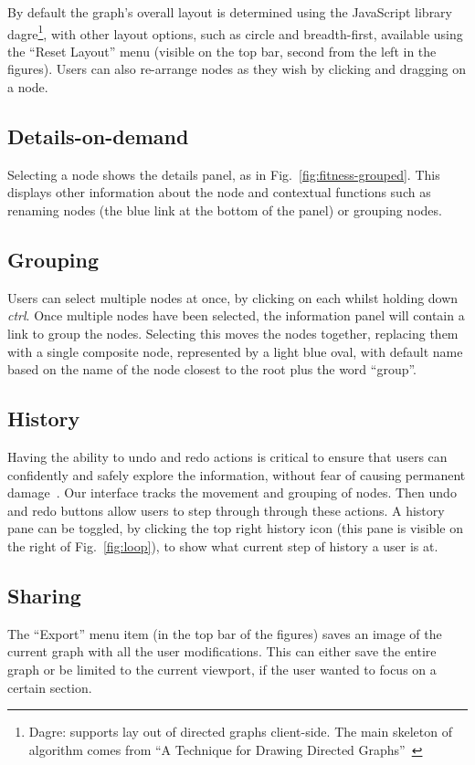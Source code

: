 By default the graph's overall layout is determined using the JavaScript library dagre\footnote{Dagre: supports lay out of directed graphs client-side. The main skeleton of algorithm comes from ``A Technique for Drawing Directed Graphs''~\cite{Gansner1993}}, with other layout options, such as circle and breadth-first, available using the ``Reset Layout'' menu (visible on the top bar, second from the left in the figures). Users can also re-arrange nodes as they wish by clicking and dragging on a node. 

\subsection{Details-on-demand}
Selecting a node shows the details panel, as in Fig.~\ref{fig:fitness-grouped}. This displays other information about the node and contextual functions such as renaming nodes (the blue link at the bottom of the panel) or grouping nodes.

\subsection{Grouping}

Users can select multiple nodes at once, by clicking on each whilst holding down \textit{ctrl}. 
Once multiple nodes have been selected, the information panel will contain a link to group the nodes. 
Selecting this moves the nodes together, replacing them with a single composite node, represented by a light blue oval, 
with default name based on the name of the node closest to the root plus the word ``group''. 

\subsection{History}

Having the ability to undo and redo 
actions is critical to ensure that users can confidently and safely explore the information, 
without fear of causing permanent damage~\cite{Shneiderman1996}. 
Our interface tracks the movement and grouping of nodes. 
Then undo and redo buttons allow users to step through through these actions. 
A history pane can be toggled, by clicking the top right history icon (this pane is visible on the right of Fig.~\ref{fig:loop}), to show what current step of history a user is at.

\subsection{Sharing}

The ``Export'' menu item (in the top bar of the figures)
saves an image of the current graph with all the user modifications. 
This can either save the entire graph or be limited to the current viewport,
if the user wanted to focus on a certain section.
